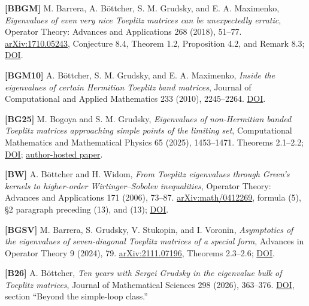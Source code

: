 \documentclass[10pt,a4paper]{article}
\begin{document}
\textbf{{[}BBGM{]}} M. Barrera, A. Böttcher, S. M. Grudsky, and E. A. Maximenko, \emph{Eigenvalues of even very nice Toeplitz matrices can be unexpectedly erratic}, Operator Theory: Advances and Applications 268 (2018), 51--77. \href{https://arxiv.org/abs/1710.05243}{arXiv:1710.05243}, Conjecture 8.4, Theorem 1.2, Proposition 4.2, and Remark 8.3; \href{https://doi.org/10.1007/978-3-319-75996-8_2}{DOI}.

\textbf{{[}BGM10{]}} A. Böttcher, S. M. Grudsky, and E. A. Maximenko, \emph{Inside the eigenvalues of certain Hermitian Toeplitz band matrices}, Journal of Computational and Applied Mathematics 233 (2010), 2245--2264. \href{https://doi.org/10.1016/j.cam.2009.10.010}{DOI}.

\textbf{{[}BG25{]}} M. Bogoya and S. M. Grudsky, \emph{Eigenvalues of non-Hermitian banded Toeplitz matrices approaching simple points of the limiting set}, Computational Mathematics and Mathematical Physics 65 (2025), 1453--1471. Theorems 2.1--2.2; \href{https://doi.org/10.1134/S0965542525700745}{DOI}; \href{https://www.math.cinvestav.mx/~grudsky/Papers/162.pdf}{author-hosted paper}.

\textbf{{[}BW{]}} A. Böttcher and H. Widom, \emph{From Toeplitz eigenvalues through Green's kernels to higher-order Wirtinger--Sobolev inequalities}, Operator Theory: Advances and Applications 171 (2006), 73--87. \href{https://arxiv.org/abs/math/0412269}{arXiv:math/0412269}, formula (5), §2 paragraph preceding (13), and (13); \href{https://doi.org/10.1007/978-3-7643-7980-3_4}{DOI}.

\textbf{{[}BGSV{]}} M. Barrera, S. Grudsky, V. Stukopin, and I. Voronin, \emph{Asymptotics of the eigenvalues of seven-diagonal Toeplitz matrices of a special form}, Advances in Operator Theory 9 (2024), 79. \href{https://arxiv.org/abs/2111.07196}{arXiv:2111.07196}, Theorems 2.3--2.6; \href{https://doi.org/10.1007/s43036-024-00374-1}{DOI}.

\textbf{{[}B26{]}} A. Böttcher, \emph{Ten years with Sergei Grudsky in the eigenvalue bulk of Toeplitz matrices}, Journal of Mathematical Sciences 298 (2026), 363--376. \href{https://doi.org/10.1007/s10958-025-07833-x}{DOI}, section ``Beyond the simple-loop class.''
\end{document}
